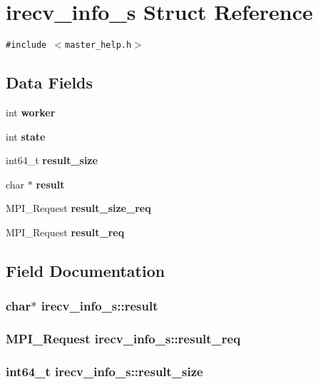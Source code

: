 \section{irecv\_\-info\_\-s Struct Reference}
\label{structirecv__info__s}
{\tt \#include $<$master\_\-help.h$>$}

\subsection*{Data Fields}
\begin{CompactItemize}
\item 
int \bf{worker}
\item 
int \bf{state}
\item 
int64\_\-t \bf{result\_\-size}
\item 
char $\ast$ \bf{result}
\item 
MPI\_\-Request \bf{result\_\-size\_\-req}
\item 
MPI\_\-Request \bf{result\_\-req}
\end{CompactItemize}


\subsection{Field Documentation}
\subsubsection{\setlength{\rightskip}{0pt plus 5cm}char$\ast$ \bf{irecv\_\-info\_\-s::result}}\label{structirecv__info__s_256be4b028fe6f8087a758b8c6bff5cd}


\subsubsection{\setlength{\rightskip}{0pt plus 5cm}MPI\_\-Request \bf{irecv\_\-info\_\-s::result\_\-req}}\label{structirecv__info__s_7c53190c0c028340cb7c2b2586022215}


\subsubsection{\setlength{\rightskip}{0pt plus 5cm}int64\_\-t \bf{irecv\_\-info\_\-s::result\_\-size}}\label{structirecv__info__s_9f9558f8ee711de5c6a7b635cd4dc784}


